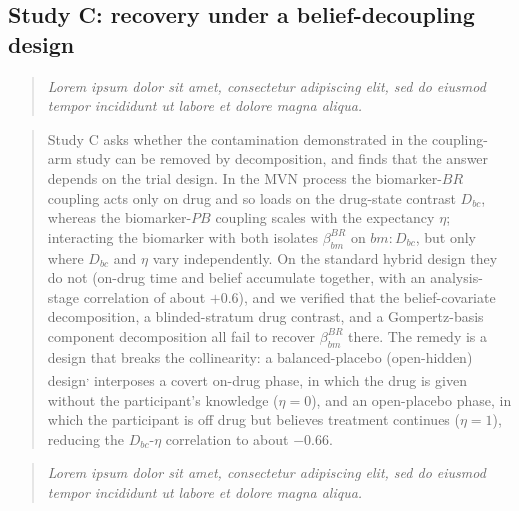 \documentclass[
  11pt,
]{article}
\newenvironment{rgt}{%
  \begin{quote}\small\itshape\color[RGB]{20,60,160}}{%
  \end{quote}}
\newenvironment{orig}{%
  \begin{quote}\normalsize\color[gray]{0.55}}{%
  \end{quote}}
\begin{document}
\subsection{Study C: recovery under a belief-decoupling design}\label{study-c-recovery-under-a-belief-decoupling-design}

\begin{rgt}
Lorem ipsum dolor sit amet, consectetur adipiscing elit, sed do eiusmod tempor incididunt ut labore et dolore magna aliqua.

\end{rgt}

\begin{orig}
Study C asks whether the contamination demonstrated in the coupling-arm
study can be removed by decomposition, and finds that the answer depends
on the trial design. In the MVN process the biomarker-\(BR\) coupling acts
only on drug and so loads on the drug-state contrast \(D_{bc}\), whereas the
biomarker-\(PB\) coupling scales with the expectancy \(\eta\); interacting the
biomarker with both isolates \(\beta_{bm}^{BR}\) on \(bm{:}D_{bc}\), but only
where \(D_{bc}\) and \(\eta\) vary independently. On the standard hybrid
design they do not (on-drug time and belief accumulate together, with an
analysis-stage correlation of about \(+0.6\)), and we verified that the
belief-covariate decomposition, a blinded-stratum drug contrast, and a
Gompertz-basis component decomposition all fail to recover
\(\beta_{bm}^{BR}\) there. The remedy is a design that breaks the
collinearity: a balanced-placebo (open-hidden) design\textsuperscript{,} interposes a covert on-drug phase, in which
the drug is given without the participant's knowledge (\(\eta=0\)), and an
open-placebo phase, in which the participant is off drug but believes
treatment continues (\(\eta=1\)), reducing the \(D_{bc}\)-\(\eta\) correlation to
about \(-0.66\).

\end{orig}

\begin{rgt}
Lorem ipsum dolor sit amet, consectetur adipiscing elit, sed do eiusmod tempor incididunt ut labore et dolore magna aliqua.

\end{rgt}
\end{document}
